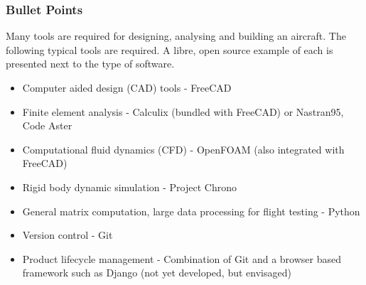 \documentclass{beamer}
\begin{document}
\begin{frame}
\frametitle{Bullet Points}

Many tools are required for designing, analysing and building an aircraft.  The following typical tools are required.  A libre, open source example of each is presented next to the type of software.

\begin{itemize}
\item Computer aided design (CAD) tools - FreeCAD
\item Finite element analysis - Calculix (bundled with FreeCAD) or Nastran95, Code Aster
\item Computational fluid dynamics (CFD) - OpenFOAM (also integrated with FreeCAD)
\item Rigid body dynamic simulation - Project Chrono
\item General matrix computation, large data processing for flight testing - Python
\item Version control - Git
\item Product lifecycle management - Combination of Git and a browser based framework such as Django (not yet developed, but envisaged)
\end{itemize}
\end{frame}


\end{document}
